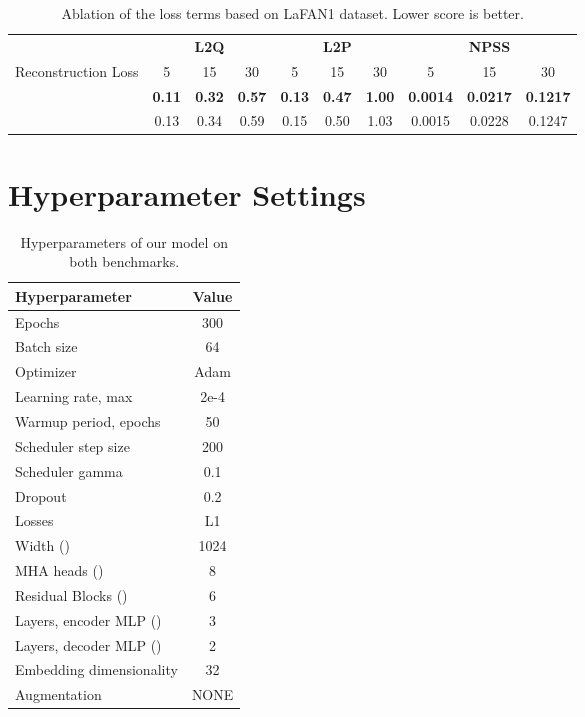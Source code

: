 \documentclass[letterpaper]{article} \usepackage[]{aaai23}  \usepackage{times}  \usepackage{helvet}  \usepackage{courier}  \usepackage[hyphens]{url}  \usepackage{graphicx} \urlstyle{rm} \def\UrlFont{\rm}  \usepackage{natbib}  \usepackage{caption} \frenchspacing  \setlength{\pdfpagewidth}{8.5in} \setlength{\pdfpageheight}{11in}
\newcommand{\ballot}{\ding{55}}
\renewcommand{\checkmark}{\ding{51}}
\begin{document}
\begin{table*}[!ht]
\centering
\caption{Ablation of the loss terms based on LaFAN1 dataset. Lower score is better.}
\centering
\begin{tabular}{cccccccccc}
\multicolumn{1}{c}{} &\multicolumn{3}{c}{\textbf{L2Q}} &\multicolumn{3}{c}{\textbf{L2P}} &\multicolumn{3}{c}{\textbf{NPSS}} \\
\cmidrule(lr){2-4}\cmidrule(lr){5-7}\cmidrule(lr){8-10}
Reconstruction Loss & 5 & 15 & 30 & 5 & 15 & 30 & 5 & 15 & 30\\
\cmidrule(lr){1-10}
\checkmark & \bf{0.11}	& \bf{0.32} &	\bf{0.57} &	\bf{0.13} &	\bf{0.47} &	\bf{1.00} &	\bf{0.0014} &	\bf{0.0217} &	\bf{0.1217} \\
\ballot & 0.13 & 0.34 & 0.59 & 0.15 & 0.50 & 1.03 & 0.0015 & 0.0228 & 0.1247 \\
\cmidrule(lr){1-10}
\end{tabular}
\label{tab:ablation_loss_terms}
\end{table*}


\section{Hyperparameter Settings} \label{app:hyperparameter_settings}

\begin{table}[!ht]
    \centering
    \begin{tabular}{lc}
        \toprule
        Hyperparameter & Value  \\ 
        \midrule
        Epochs	& 300	\\ 
        Batch size & 64	\\
        Optimizer & Adam \\
        Learning rate, max & 2e-4  \\
        Warmup period, epochs & 50 \\
        Scheduler step size & 200 \\
        Scheduler gamma & 0.1 \\
        Dropout & 0.2 \\
        Losses & L1 \\
        Width () & 1024 \\
        MHA heads () & 8 \\
        Residual Blocks () & 6 \\
        Layers, encoder MLP () & 3 \\
        Layers, decoder MLP () & 2 \\
        Embedding dimensionality & 32 \\
        Augmentation & NONE \\
        \bottomrule
    \end{tabular}
    \vspace{1em}
    \caption{Hyperparameters of our model on both benchmarks.}
    \label{table:hyperparameter_settings}
\end{table}
\end{document}
